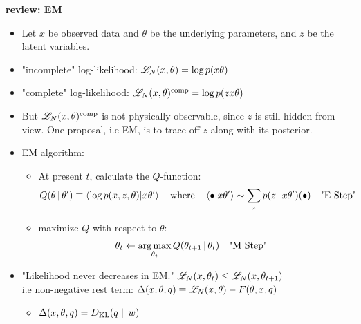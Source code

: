 \begin{frame} [t]
      {\bf review: EM}
\begin{itemize}
    \item Let $x$ be observed data and 
          $\theta$ be the underlying
          parameters,
          and $z$ be the latent variables. 
    \item "incomplete" log-likelihood:  
       $ \mathscr {L} _{N} (x, \theta)
         = \textnormal{log}\, p(x \theta) 
       $  
    \item "complete" log-likelihood:
       $ \mathscr {L} _{N} (x, \theta) 
          ^{\textnormal{comp}}
         = \textnormal{log}\, p(z x \theta) 
       $
    \item But 
      $ \mathscr {L} _{N} (x, \theta) 
          ^{\textnormal{comp}}
      $ is not physically observable, since 
      $ z$ is still hidden from view. One proposal, i.e EM, is to trace off $z$ along with its posterior.
    \item 
       EM algorithm: 
       \begin{itemize}
           \item At present $t$, 
              calculate the $Q$-function:
              {\footnotesize 
              \begin{align*}
                Q \conditional 
                   {\theta}
                   {\theta ^{\prime}}
               \equiv 
                \braket 
                    { \varlog p (x,z,\theta)
                    } 
                {x \theta ^{\prime}}
               \qq {where}
                \braket 
                 {\bullet}
                 {x \theta ^{\prime}}
                \sim 
                \sum _{z} 
                   p \conditional 
                      {z} {x \theta ^{\prime}}
                   (\bullet)
               \qq {"E Step"}
              \end{align*}
              }
           \item 
              maximize $Q$ with respect to
              $\theta$:
              {\footnotesize
              \begin{align*}
                    \theta _{t} 
                \leftarrow 
                    \argmax_{\theta _{t}} 
                    Q \conditional
                     {\theta _{t+1}}
                     {\theta _{t}}
                    \qq {"M Step"}
              \end{align*}
              }
       \end{itemize} 
    \item "Likelihood never decreases in EM."
        $ \mathscr {L} _{N} (x , \theta _{t}) \leq 
          \mathscr {L} _{N} (x , \theta _{t + 1})
        $ 
        \\ i.e non-negative rest term:
        $ \Delta (x,\theta, q) \equiv 
          \mathscr {L} _{N} (x,\theta) 
                - F (\theta ,x, q)
        $
        \begin{itemize}
            \item 
            $ \Delta (x, \theta, q) 
              = 
              D _{\text{KL}} (q\;\Vert\;w)
            $
        \end{itemize}       
\end{itemize}    
\end{frame}  

